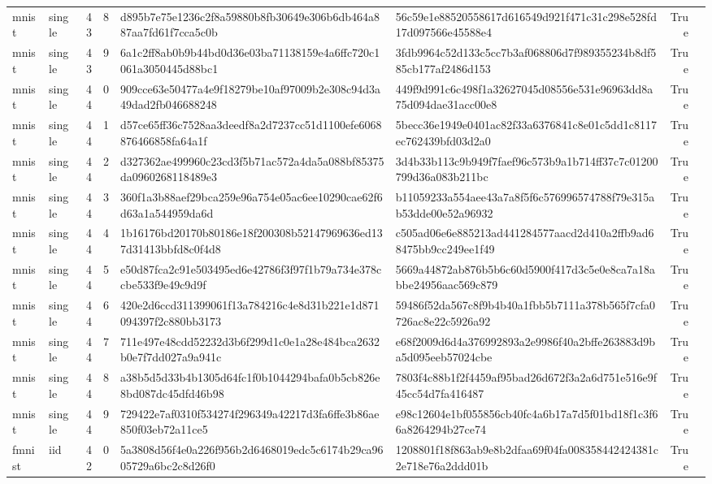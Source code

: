 \begin{tabular}{llrrllrl}
mnist & single & 43 & 8 & d895b7e75e1236c2f8a59880b8fb30649e306b6db464a887aa7fd61f7cca5c0b & 56c59e1e88520558617d616549d921f471c31c298e528fd17d097566e45588e4 & True &  \\
mnist & single & 43 & 9 & 6a1c2ff8ab0b9b44bd0d36e03ba71138159e4a6ffc720c1061a3050445d88bc1 & 3fdb9964c52d133c5cc7b3af068806d7f989355234b8df585cb177af2486d153 & True &  \\
mnist & single & 44 & 0 & 909cce63e50477a4e9f18279be10af97009b2e308c94d3a49dad2fb046688248 & 449f9d991c6c498f1a32627045d08556e531e96963dd8a75d094dae31acc00e8 & True &  \\
mnist & single & 44 & 1 & d57ce65ff36c7528aa3deedf8a2d7237cc51d1100efe6068876466858fa64a1f & 5becc36e1949e0401ac82f33a6376841c8e01c5dd1c8117ec762439bfd03d2a0 & True &  \\
mnist & single & 44 & 2 & d327362ae499960c23cd3f5b71ac572a4da5a088bf85375da0960268118489e3 & 3d4b33b113c9b949f7faef96c573b9a1b714ff37c7c01200799d36a083b211bc & True &  \\
mnist & single & 44 & 3 & 360f1a3b88aef29bca259e96a754e05ac6ee10290cae62f6d63a1a544959da6d & b11059233a554aee43a7a8f5f6c576996574788f79e315ab53dde00e52a96932 & True &  \\
mnist & single & 44 & 4 & 1b16176bd20170b80186e18f200308b52147969636ed137d31413bbfd8c0f4d8 & c505ad06e6e885213ad441284577aacd2d410a2ffb9ad68475bb9cc249ee1f49 & True &  \\
mnist & single & 44 & 5 & e50d87fca2c91e503495ed6e42786f3f97f1b79a734e378ccbe533f9e49c9d9f & 5669a44872ab876b5b6c60d5900f417d3c5e0e8ca7a18abbe24956aac569c879 & True &  \\
mnist & single & 44 & 6 & 420e2d6ccd311399061f13a784216c4e8d31b221e1d871094397f2c880bb3173 & 59486f52da567c8f9b4b40a1fbb5b7111a378b565f7cfa0726ac8e22c5926a92 & True &  \\
mnist & single & 44 & 7 & 711e497e48cdd52232d3b6f299d1c0e1a28e484bca2632b0e7f7dd027a9a941c & e68f2009d6d4a376992893a2e9986f40a2bffe263883d9ba5d095eeb57024cbe & True &  \\
mnist & single & 44 & 8 & a38b5d5d33b4b1305d64fc1f0b1044294bafa0b5cb826e8bd087dc45dfd46b98 & 7803f4c88b1f2f4459af95bad26d672f3a2a6d751e516e9f45cc54d7fa416487 & True &  \\
mnist & single & 44 & 9 & 729422e7af0310f534274f296349a42217d3fa6ffe3b86ae850f03eb72a11ce5 & e98c12604e1bf055856cb40fc4a6b17a7d5f01bd18f1c3f66a8264294b27ce74 & True &  \\
fmnist & iid & 42 & 0 & 5a3808d56f4e0a226f956b2d6468019edc5c6174b29ca9605729a6bc2c8d26f0 & 1208801f18f863ab9e8b2dfaa69f04fa008358442424381c2e718e76a2ddd01b & True &  \\

\end{tabular}
